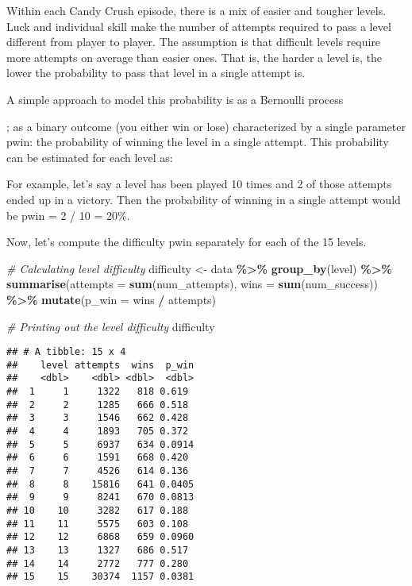 \documentclass[
]{article}
\newenvironment{Shaded}{\begin{snugshade}}{\end{snugshade}}
\newcommand{\AttributeTok}[1]{\textcolor[rgb]{0.13,0.29,0.53}{#1}}
\newcommand{\CommentTok}[1]{\textcolor[rgb]{0.56,0.35,0.01}{\textit{#1}}}
\newcommand{\FunctionTok}[1]{\textcolor[rgb]{0.13,0.29,0.53}{\textbf{#1}}}
\newcommand{\NormalTok}[1]{#1}
\newcommand{\OtherTok}[1]{\textcolor[rgb]{0.56,0.35,0.01}{#1}}
\newcommand{\SpecialCharTok}[1]{\textcolor[rgb]{0.81,0.36,0.00}{\textbf{#1}}}
\begin{document}
Within each Candy Crush episode, there is a mix of easier and tougher
levels. Luck and individual skill make the number of attempts required
to pass a level different from player to player. The assumption is that
difficult levels require more attempts on average than easier ones. That
is, the harder a level is, the lower the probability to pass that level
in a single attempt is.

A simple approach to model this probability is as a Bernoulli process

; as a binary outcome (you either win or lose) characterized by a single
parameter pwin: the probability of winning the level in a single
attempt. This probability can be estimated for each level as:

For example, let's say a level has been played 10 times and 2 of those
attempts ended up in a victory. Then the probability of winning in a
single attempt would be pwin = 2 / 10 = 20\%.

Now, let's compute the difficulty pwin separately for each of the 15
levels.

\begin{Shaded}
\begin{Highlighting}[]
\CommentTok{\# Calculating level difficulty}
\NormalTok{difficulty }\OtherTok{\textless{}{-}}\NormalTok{ data }\SpecialCharTok{\%\textgreater{}\%}
 \FunctionTok{group\_by}\NormalTok{(level) }\SpecialCharTok{\%\textgreater{}\%}
 \FunctionTok{summarise}\NormalTok{(}\AttributeTok{attempts =} \FunctionTok{sum}\NormalTok{(num\_attempts), }\AttributeTok{wins =} \FunctionTok{sum}\NormalTok{(num\_success)) }\SpecialCharTok{\%\textgreater{}\%}
 \FunctionTok{mutate}\NormalTok{(}\AttributeTok{p\_win =}\NormalTok{ wins }\SpecialCharTok{/}\NormalTok{ attempts)}

\CommentTok{\# Printing out the level difficulty}
\NormalTok{difficulty}
\end{Highlighting}
\end{Shaded}

\begin{verbatim}
## # A tibble: 15 x 4
##    level attempts  wins  p_win
##    <dbl>    <dbl> <dbl>  <dbl>
##  1     1     1322   818 0.619 
##  2     2     1285   666 0.518 
##  3     3     1546   662 0.428 
##  4     4     1893   705 0.372 
##  5     5     6937   634 0.0914
##  6     6     1591   668 0.420 
##  7     7     4526   614 0.136 
##  8     8    15816   641 0.0405
##  9     9     8241   670 0.0813
## 10    10     3282   617 0.188 
## 11    11     5575   603 0.108 
## 12    12     6868   659 0.0960
## 13    13     1327   686 0.517 
## 14    14     2772   777 0.280 
## 15    15    30374  1157 0.0381
\end{verbatim}
\end{document}
